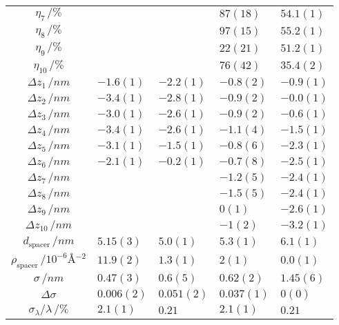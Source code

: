 \documentclass[\main/dresen_thesis.tex]{subfiles}
\begin{document}
\begin{table}[!htbp]
\begin{tabular}{ c | l | l | l | l}
       $\eta_7     \, / \unit{\%}$      &           &           & $87(18)$  & $54.1(1)$\\
       $\eta_8     \, / \unit{\%}$      &           &           & $97(15)$  & $55.2(1)$\\
       $\eta_9     \, / \unit{\%}$      &           &           & $22(21)$  & $51.2(1)$\\
       $\eta_{10}     \, / \unit{\%}$   &           &           & $76(42)$  & $35.4(2)$\\
       \hline
       $\Delta z_1 \, / \unit{nm} $     & $-1.6(1)$ & $-2.2(1)$ & $-0.8(2)$ & $-0.9(1)$\\
       $\Delta z_2 \, / \unit{nm} $     & $-3.4(1)$ & $-2.8(1)$ & $-0.9(2)$ & $-0.0(1)$\\
       $\Delta z_3 \, / \unit{nm} $     & $-3.0(1)$ & $-2.6(1)$ & $-0.9(2)$ & $-0.6(1)$\\
       $\Delta z_4 \, / \unit{nm} $     & $-3.4(1)$ & $-2.6(1)$ & $-1.1(4)$ & $-1.5(1)$\\
       $\Delta z_5 \, / \unit{nm} $     & $-3.1(1)$ & $-1.5(1)$ & $-0.8(6)$ & $-2.3(1)$\\
       $\Delta z_6 \, / \unit{nm} $     & $-2.1(1)$ & $-0.2(1)$ & $-0.7(8)$ & $-2.5(1)$\\
       $\Delta z_7 \, / \unit{nm} $     &           &           & $-1.2(5)$ & $-2.4(1)$\\
       $\Delta z_8 \, / \unit{nm} $     &           &           & $-1.5(5)$ & $-2.4(1)$\\
       $\Delta z_9 \, / \unit{nm} $     &           &           & $ 0(1)$   & $-2.6(1)$\\
       $\Delta z_{10} \, / \unit{nm} $  &           &           & $-1(2)$   & $-3.2(1)$\\
       \hline
       $d_\mathrm{spacer}   \, / \unit{nm} $                        & $5.15(3)$ & $5.0(1)$  & $5.3(1)$ & $6.1(1)$\\
       $\rho_\mathrm{spacer}\, / \unit{10^{-6} \angstrom^{-2}} $    & $11.9(2)$ & $1.3(1)$  & $2(1)$   & $0.0(1)$\\
       $\sigma     \, / \unit{nm} $                                 & $0.47(3)$ & $0.6(5)$  & $0.62(2)$& $1.45(6)$\\
       $\Delta \sigma$                                              & $0.006(2)$& $0.051(2)$& $0.037(1)$ & $0(0)$\\
       $\sigma_\lambda / \lambda\, / \unit{\%}$                     & $2.1(1)$  & $0.21$    & $2.1(1)$  & $0.21$\\

\end{tabular}
\end{table}
\end{document}
